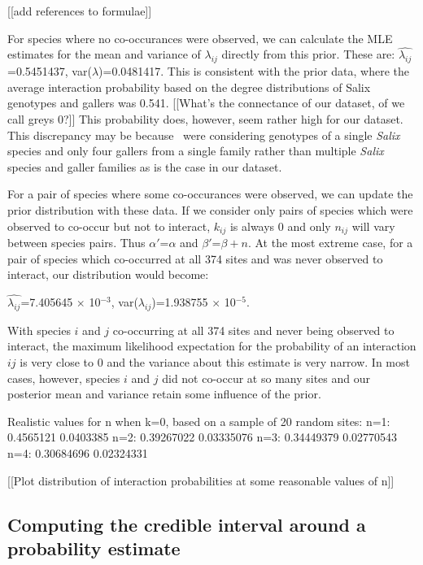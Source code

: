 \documentclass[12pt]{article}
\begin{document}
      [[add references to formulae]]

      For species where no co-occurances were observed, we can calculate the MLE estimates for the mean and variance of $\lambda_{ij}$ directly from this prior. These are:
      $\hat{\lambda_{ij}}$=0.5451437, var($\lambda$)=0.0481417.
      This is consistent with the prior data, where the average interaction probability based on the degree distributions of Salix genotypes and gallers was 0.541. [[What's the connectance of our dataset, of we call greys 0?]] This probability does, however, seem rather high for our dataset. This discrepancy may be because~\citep{Balbour2016} were considering genotypes of a single \emph{Salix} species and only four gallers from a single family rather than multiple \emph{Salix} species and galler families as is the case in our dataset.


      For a pair of species where some co-occurances were observed, we can update the prior distribution with these data. If we consider only pairs of species which were observed to co-occur but not to interact, $k_{ij}$ is always 0 and only $n_{ij}$ will vary between species pairs. Thus $\alpha'$=$\alpha$ and $\beta'$=$\beta + n$. At the most extreme case, for a pair of species which co-occurred at all 374 sites and was never observed to interact, our distribution would become:


      $\hat{\lambda_{ij}}$=7.405645 $\times$ 10$^{-3}$, var($\lambda_{ij}$)=1.938755 $\times$ 10$^{-5}$.
      
      With species $i$ and $j$ co-occurring at all 374 sites and never being observed to interact, the maximum likelihood expectation for the probability of an interaction $ij$ is very close to 0 and the variance about this estimate is very narrow. In most cases, however, species $i$ and $j$ did not co-occur at so many sites and our posterior mean and variance retain some influence of the prior.


      Realistic values for n when k=0, based on a sample of 20 random sites:
      n=1: 0.4565121 0.0403385
      n=2: 0.39267022 0.03335076
      n=3: 0.34449379 0.02770543
      n=4: 0.30684696 0.02324331


      [[Plot distribution of interaction probabilities at some reasonable values of n]]


  \subsection*{Computing the credible interval around a probability estimate}
\end{document}
